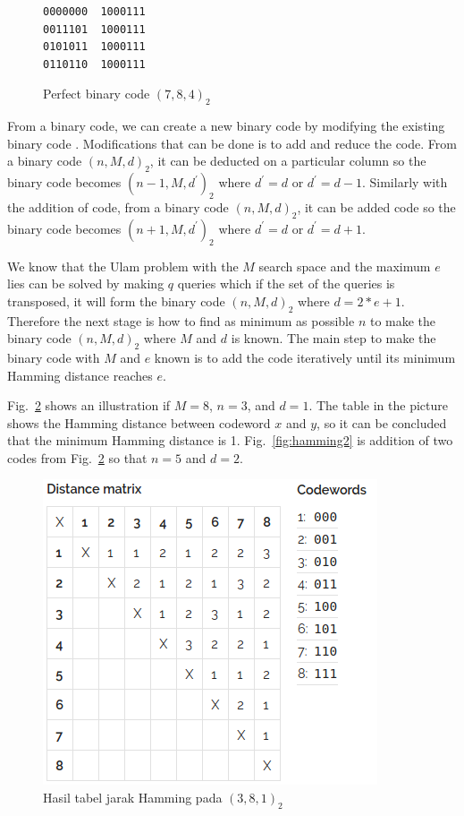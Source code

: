 \documentclass[conference,compsoc]{IEEEtran}
\begin{document}
\begin{figure}
\centering
\begin{BVerbatim}
0000000  1000111
0011101  1000111
0101011  1000111
0110110  1000111
\end{BVerbatim}
\caption{Perfect binary code $(7,8,4)_2$}
\label{fig:binarycode784}
\end{figure}

From a binary code, we can create a new binary code by modifying the existing binary code \cite{Huffman}. Modifications that can be done is to add and reduce the code. From a binary code $(n,M,d)_2 $, it can be deducted on a particular column so the binary code becomes $(n-1,M,d^\prime) _2 $ where $d^\prime = d$ or $d^\prime = d-1$. Similarly with the addition of code, from a binary code $(n,M,d)_2$, it can be added code so the binary code becomes $(n+1,M,d^\prime)_2 $ where $d^\prime = d$ or $d^\prime = d+1$.

We know that the Ulam problem with the $M$ search space and the maximum $e$ lies can be solved by making $q$ queries which if the set of the queries is transposed, it will form the binary code $(n,M,d) _2$ where $d=2*e+1$. Therefore the next stage is how to find as minimum as possible $n$ to make the binary code $(n,M,d)_2$ where $M$ and $d$ is known. The main step to make the binary code with $M$ and $e$ known is to add the code iteratively until its minimum Hamming distance reaches $e$.

Fig.~\ref{fig:hamming1} shows an illustration if $M = 8$, $n = 3$, and $d = 1$. The table in the picture shows the Hamming distance between codeword $x$ and $y$, so it can be concluded that the minimum Hamming distance is 1. Fig.~\ref{fig:hamming2} is addition of two codes from Fig.~\ref{fig:hamming1} so that $n = 5$ and $d = 2$.

\begin{figure}
\centering
\includegraphics[scale=0.7]{../img/hamming1.png}
\caption{Hasil tabel jarak Hamming pada $(3,8,1)_2$}
\label{fig:hamming1}
\end{figure}
\end{document}

